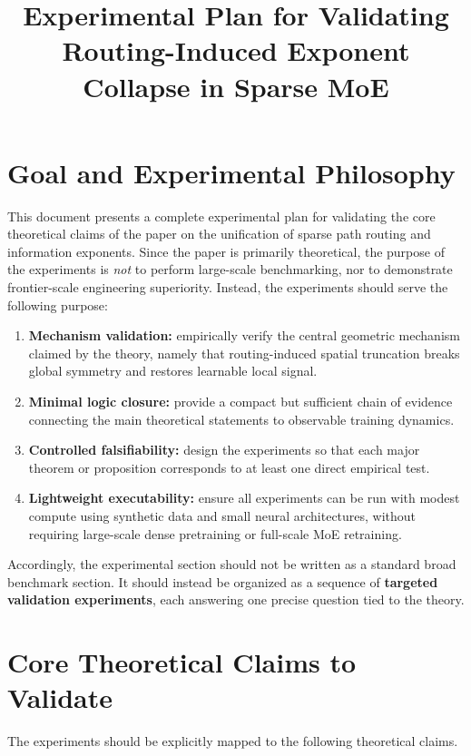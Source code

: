 \documentclass[11pt]{article}
\title{\textbf{Experimental Plan for Validating Routing-Induced Exponent Collapse in Sparse MoE}}
\author{}
\date{}
\begin{document}
\maketitle

\section{Goal and Experimental Philosophy}

This document presents a complete experimental plan for validating the core theoretical claims of the paper on the unification of sparse path routing and information exponents. Since the paper is primarily theoretical, the purpose of the experiments is \emph{not} to perform large-scale benchmarking, nor to demonstrate frontier-scale engineering superiority. Instead, the experiments should serve the following purpose:

\begin{enumerate}[leftmargin=2em]
    \item \textbf{Mechanism validation:} empirically verify the central geometric mechanism claimed by the theory, namely that routing-induced spatial truncation breaks global symmetry and restores learnable local signal.
    \item \textbf{Minimal logic closure:} provide a compact but sufficient chain of evidence connecting the main theoretical statements to observable training dynamics.
    \item \textbf{Controlled falsifiability:} design the experiments so that each major theorem or proposition corresponds to at least one direct empirical test.
    \item \textbf{Lightweight executability:} ensure all experiments can be run with modest compute using synthetic data and small neural architectures, without requiring large-scale dense pretraining or full-scale MoE retraining.
\end{enumerate}

Accordingly, the experimental section should not be written as a standard broad benchmark section. It should instead be organized as a sequence of \textbf{targeted validation experiments}, each answering one precise question tied to the theory.

\section{Core Theoretical Claims to Validate}

The experiments should be explicitly mapped to the following theoretical claims.
\end{document}
